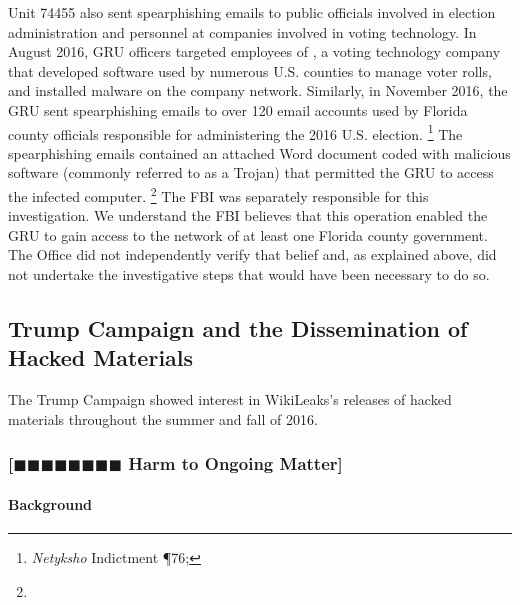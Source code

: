 Unit 74455 also sent spearphishing emails to public officials involved in election administration and personnel at companies involved in voting technology.
In August 2016, GRU officers targeted employees of , a voting technology company that developed software used by numerous U.S. counties to manage voter rolls, and installed malware on the company network.
Similarly, in November 2016, the GRU sent spearphishing emails to over 120 email accounts used by Florida county officials responsible for administering the 2016 U.S. election.%
\footnote{\textit{Netyksho} Indictment \P 76; }
The spearphishing emails contained an attached Word document coded with malicious software (commonly referred to as a Trojan) that permitted the GRU to access the infected computer.%
\footnote{}
The FBI was separately responsible for this investigation.
We understand the FBI believes that this operation enabled the GRU to gain access to the network of at least one Florida county government.
The Office did not independently verify that belief and, as explained above, did not undertake the investigative steps that would have been necessary to do so.

\subsection{Trump Campaign and the Dissemination of Hacked Materials}

The Trump Campaign showed interest in WikiLeaks's releases of hacked materials throughout the summer and fall of 2016.

\subsubsection{[$\blacksquare\blacksquare\blacksquare\blacksquare\blacksquare\blacksquare\blacksquare\blacksquare$ Harm to Ongoing Matter]}

\paragraph{Background}


